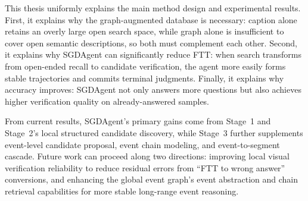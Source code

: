 \documentclass[sigconf, screen, review, anonymous]{acmart}
\begin{document}
This thesis uniformly explains the main method design and experimental results. First, it explains why the graph-augmented database is necessary: caption alone retains an overly large open search space, while graph alone is insufficient to cover open semantic descriptions, so both must complement each other. Second, it explains why SGDAgent can significantly reduce FTT: when search transforms from open-ended recall to candidate verification, the agent more easily forms stable trajectories and commits terminal judgments. Finally, it explains why accuracy improves: SGDAgent not only answers more questions but also achieves higher verification quality on already-answered samples.

From current results, SGDAgent's primary gains come from Stage~1 and Stage~2's local structured candidate discovery, while Stage~3 further supplements event-level candidate proposal, event chain modeling, and event-to-segment cascade. Future work can proceed along two directions: improving local visual verification reliability to reduce residual errors from ``FTT to wrong answer'' conversions, and enhancing the global event graph's event abstraction and chain retrieval capabilities for more stable long-range event reasoning.


\begin{acks}
\end{acks}



\end{document}
